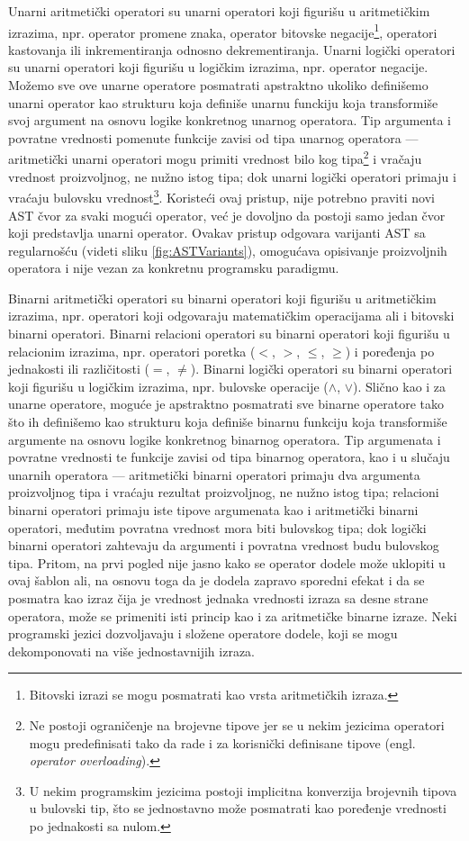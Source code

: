 Unarni aritmetički operatori su unarni operatori koji figurišu u aritmetičkim izrazima, npr. operator promene znaka, operator bitovske negacije\footnote{Bitovski izrazi se mogu posmatrati kao vrsta aritmetičkih izraza.}, operatori kastovanja ili inkrementiranja odnosno dekrementiranja. Unarni logički operatori su unarni operatori koji figurišu u logičkim izrazima, npr. operator negacije. Možemo sve ove unarne operatore posmatrati apstraktno ukoliko definišemo unarni operator kao strukturu koja definiše unarnu funckiju koja transformiše svoj argument na osnovu logike konkretnog unarnog operatora. Tip argumenta i povratne vrednosti pomenute funkcije zavisi od tipa unarnog operatora --- aritmetički unarni operatori mogu primiti vrednost bilo kog tipa\footnote{Ne postoji ograničenje na brojevne tipove jer se u nekim jezicima operatori mogu predefinisati tako da rade i za korisnički definisane tipove (engl. \emph{operator overloading}).} i vračaju vrednost proizvoljnog, ne nužno istog tipa; dok unarni logički operatori primaju i vraćaju bulovsku vrednost\footnote{U nekim programskim jezicima postoji implicitna konverzija brojevnih tipova u bulovski tip, što se jednostavno može posmatrati kao poređenje vrednosti po jednakosti sa nulom.}. Koristeći ovaj pristup, nije potrebno praviti novi AST čvor za svaki mogući operator, već je dovoljno da postoji samo jedan čvor koji predstavlja unarni operator. Ovakav pristup odgovara varijanti AST sa regularnošću (videti sliku \ref{fig:ASTVariants}), omogućava opisivanje proizvoljnih operatora i nije vezan za konkretnu programsku paradigmu.

Binarni aritmetički operatori su binarni operatori koji figurišu u aritmetičkim izrazima, npr. operatori koji odgovaraju matematičkim operacijama ali i bitovski binarni operatori. Binarni relacioni operatori su binarni operatori koji figurišu u relacionim izrazima, npr. operatori poretka ($<$, $>$, $\leq$, $\geq$) i poređenja po jednakosti ili različitosti ($=$, $\neq$). Binarni logički operatori su binarni operatori koji figurišu u logičkim izrazima, npr. bulovske operacije ($\wedge$, $\vee$). Slično kao i za unarne operatore, moguće je apstraktno posmatrati sve binarne operatore tako što ih definišemo kao strukturu koja definiše binarnu funkciju koja transformiše argumente na osnovu logike konkretnog binarnog operatora. Tip argumenata i povratne vrednosti te funkcije zavisi od tipa binarnog operatora, kao i u slučaju unarnih operatora --- aritmetički binarni operatori primaju dva argumenta proizvoljnog tipa i vraćaju rezultat proizvoljnog, ne nužno istog tipa; relacioni binarni operatori primaju iste tipove argumenata kao i aritmetički binarni operatori, međutim povratna vrednost mora biti bulovskog tipa; dok logički binarni operatori zahtevaju da argumenti i povratna vrednost budu bulovskog tipa. Pritom, na prvi pogled nije jasno kako se operator dodele može uklopiti u ovaj šablon ali, na osnovu toga da je dodela zapravo sporedni efekat i da se posmatra kao izraz čija je vrednost jednaka vrednosti izraza sa desne strane operatora, može se primeniti isti princip kao i za aritmetičke binarne izraze. Neki programski jezici dozvoljavaju i složene operatore dodele, koji se mogu dekomponovati na više jednostavnijih izraza.
